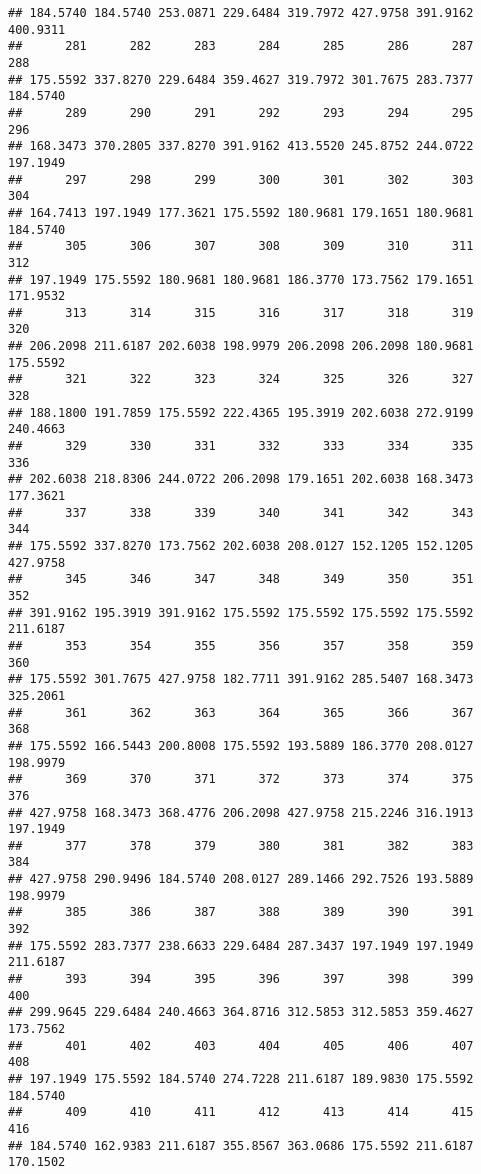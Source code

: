 \documentclass[
]{article}
\begin{document}
\begin{verbatim}
## 184.5740 184.5740 253.0871 229.6484 319.7972 427.9758 391.9162 400.9311 
##      281      282      283      284      285      286      287      288 
## 175.5592 337.8270 229.6484 359.4627 319.7972 301.7675 283.7377 184.5740 
##      289      290      291      292      293      294      295      296 
## 168.3473 370.2805 337.8270 391.9162 413.5520 245.8752 244.0722 197.1949 
##      297      298      299      300      301      302      303      304 
## 164.7413 197.1949 177.3621 175.5592 180.9681 179.1651 180.9681 184.5740 
##      305      306      307      308      309      310      311      312 
## 197.1949 175.5592 180.9681 180.9681 186.3770 173.7562 179.1651 171.9532 
##      313      314      315      316      317      318      319      320 
## 206.2098 211.6187 202.6038 198.9979 206.2098 206.2098 180.9681 175.5592 
##      321      322      323      324      325      326      327      328 
## 188.1800 191.7859 175.5592 222.4365 195.3919 202.6038 272.9199 240.4663 
##      329      330      331      332      333      334      335      336 
## 202.6038 218.8306 244.0722 206.2098 179.1651 202.6038 168.3473 177.3621 
##      337      338      339      340      341      342      343      344 
## 175.5592 337.8270 173.7562 202.6038 208.0127 152.1205 152.1205 427.9758 
##      345      346      347      348      349      350      351      352 
## 391.9162 195.3919 391.9162 175.5592 175.5592 175.5592 175.5592 211.6187 
##      353      354      355      356      357      358      359      360 
## 175.5592 301.7675 427.9758 182.7711 391.9162 285.5407 168.3473 325.2061 
##      361      362      363      364      365      366      367      368 
## 175.5592 166.5443 200.8008 175.5592 193.5889 186.3770 208.0127 198.9979 
##      369      370      371      372      373      374      375      376 
## 427.9758 168.3473 368.4776 206.2098 427.9758 215.2246 316.1913 197.1949 
##      377      378      379      380      381      382      383      384 
## 427.9758 290.9496 184.5740 208.0127 289.1466 292.7526 193.5889 198.9979 
##      385      386      387      388      389      390      391      392 
## 175.5592 283.7377 238.6633 229.6484 287.3437 197.1949 197.1949 211.6187 
##      393      394      395      396      397      398      399      400 
## 299.9645 229.6484 240.4663 364.8716 312.5853 312.5853 359.4627 173.7562 
##      401      402      403      404      405      406      407      408 
## 197.1949 175.5592 184.5740 274.7228 211.6187 189.9830 175.5592 184.5740 
##      409      410      411      412      413      414      415      416 
## 184.5740 162.9383 211.6187 355.8567 363.0686 175.5592 211.6187 170.1502 

\end{verbatim}
\end{document}
